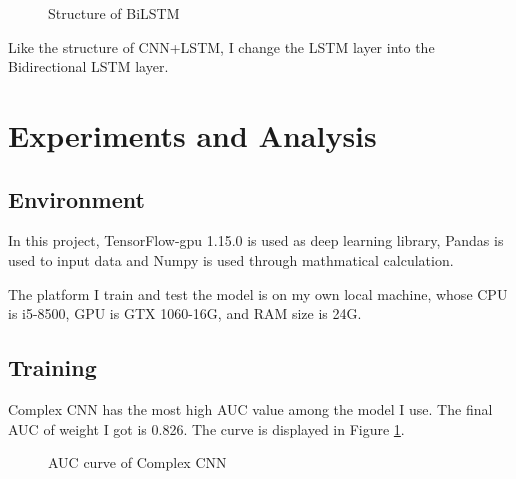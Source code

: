 \documentclass{article}
\begin{document}
\begin{figure}[h]
	\centering
	\caption{Structure of BiLSTM}
\end{figure} 

Like the structure of CNN+LSTM, I change the LSTM layer into the Bidirectional LSTM layer. 

\section{Experiments and Analysis}
\subsection{Environment}
In this project, TensorFlow-gpu 1.15.0 is used as deep learning library, Pandas is used to input data and Numpy is used through mathmatical calculation.

The platform I train and test the model is on my own local machine, whose CPU is i5-8500, GPU is GTX 1060-16G, and RAM size is 24G.

\subsection{Training}
Complex CNN has the most high AUC value among the model I use. The final AUC of weight I got is 0.826. The curve is displayed in Figure \ref{CNN}.

\begin{figure}[h]
	\centering
	\caption{AUC curve of Complex CNN}
	\label{CNN}
\end{figure} 
\end{document}
